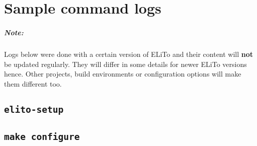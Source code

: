 \chapter{Sample command logs}

\paragraph{Note:}
Logs below were done with a certain version of ELiTo and their content
will \textbf{not} be updated regularly.  They will differ in some
details for newer ELiTo versions hence.  Other projects, build
environments or configuration options will make them different too.

\section[elito-setup]{\texttt{elito-setup}}
\label{app:log:quickstart_elito-setup}


\section[make configure]{\texttt{make configure}}
\label{app:log:quickstart_elito-configure}



